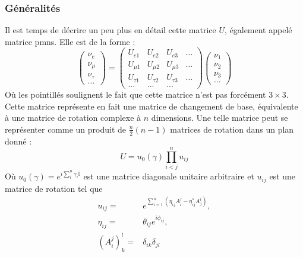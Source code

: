             \subsubsection{Généralités}
            Il est temps de décrire un peu plus en détail cette matrice $U$, également appelé matrice \gls{pmns}. Elle est de la forme : 
            \begin{equation}
                \left(\begin{matrix}
                     \nu_e \\ \nu_{\mu} \\ \nu_{\tau} \\ ...
                \end{matrix}\right) =
                \left(\begin{matrix}
                    U_{e1} & U_{e2} & U_{e3} & ... \\
                    U_{\mu 1} & U_{\mu 2} & U_{\mu 3} & ... \\
                    U_{\tau 1} & U_{\tau 2} & U_{\tau 3} & ... \\
                    ... & ... & ... &
                \end{matrix}\right)
                \left(\begin{matrix}
                     \nu_1 \\ \nu_2 \\ \nu_3 \\ ...
                \end{matrix}\right)
            \end{equation}
            Où les pointillés soulignent le fait que cette matrice n'est pas forcément $3\times 3$. Cette matrice représente en fait une matrice de changement de base, équivalente à une matrice de rotation complexe à $n$ dimensions. Une telle matrice peut se représenter comme un produit de $\frac{n}{2}(n-1)$ matrices de rotation dans un plan donné\cite{Valle2006,Harari1996} : 
            \begin{equation}\label{eq::compact_pmns}
                U=u_0(\gamma)\prod_{i<j}^n u_{ij}
            \end{equation}
            Où $u_0(\gamma)=e^{i \sum_{i}^{n}\gamma_i \mathbb{I}}$ est une matrice diagonale unitaire arbitraire et $u_{ij}$ est une matrice de rotation tel que
            \begin{equation}
                \begin{split}
                    u_{ij}= & e^{\sum_{i=1}^n\left(\eta_{ij}A_i^j-\eta_{ij}^*A_j^i\right)},\\
                    \eta_{ij} = & \theta_{ij}e^{i\phi_{ij}},\\
                    \left(A_i^j\right)_k^l = & \delta_{ik}\delta_{jl}
                \end{split}
            \end{equation}
            
